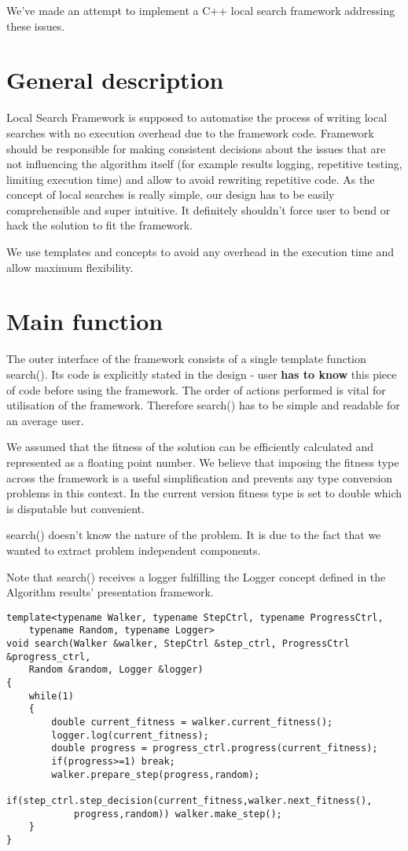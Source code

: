 We've made an attempt to implement a C++ local search 
framework addressing these issues.

\section{General description}

Local Search Framework is supposed to automatise the process of writing local searches with no execution overhead due to the framework code.
Framework should be responsible for making consistent decisions about the issues that are not influencing the algorithm itself
(for example results logging, repetitive testing, limiting execution time) and allow to avoid rewriting repetitive code.
As the concept of local searches is really simple, our design has to be easily comprehensible and super intuitive.
It definitely shouldn't force user to bend or hack the solution to fit the framework.

We use templates and concepts to avoid any overhead in the execution time and allow maximum flexibility.

\section{Main function}

The outer interface of the framework consists of a single template function search().
Its code is explicitly stated in the design - user {\bf has to know} this piece of code before using the framework.
The order of actions performed is vital for utilisation of the framework.
Therefore search() has to be simple and readable for an average user.

We assumed that the fitness of the solution can be efficiently calculated and represented as a floating point number.
We believe that imposing the fitness type across the framework is a useful simplification and prevents any type
conversion problems in this context. In the current version fitness type is set to double which is disputable but convenient.

search() doesn't know the nature of the problem.
It is due to the fact that we wanted to extract problem independent components.

Note that search() receives a logger fulfilling the Logger concept defined in the Algorithm
results' presentation framework.


\begin{lstlisting}
template<typename Walker, typename StepCtrl, typename ProgressCtrl,
	typename Random, typename Logger>
void search(Walker &walker, StepCtrl &step_ctrl, ProgressCtrl &progress_ctrl,
	Random &random, Logger &logger)
{
	while(1)
	{
		double current_fitness = walker.current_fitness();
		logger.log(current_fitness);
		double progress = progress_ctrl.progress(current_fitness);
		if(progress>=1) break;
		walker.prepare_step(progress,random);
		if(step_ctrl.step_decision(current_fitness,walker.next_fitness(),
			progress,random)) walker.make_step();
	}
}
\end{lstlisting}

